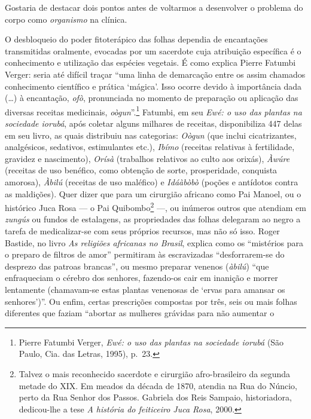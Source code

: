 Gostaria de destacar dois pontos antes de voltarmos a desenvolver o
problema do corpo como \textit{organismo} na clínica.

O desbloqueio do poder fitoterápico das folhas dependia de encantações
transmitidas oralmente, evocadas por um sacerdote cuja atribuição
específica é o conhecimento e utilização das espécies vegetais. É como
explica Pierre Fatumbi Verger: seria até difícil traçar ``uma linha de
demarcação entre os assim chamados conhecimento científico e prática
`mágica'. Isso ocorre devido à importância dada (\ldots{}) à encantação,
\textit{ofò}, pronunciada no momento de preparação ou aplicação das
diversas receitas medicinais, \textit{oògun}''.\footnote{Pierre Fatumbi
  Verger, \textit{Ewé: o uso das plantas na sociedade iorubá} (São Paulo,
  Cia. das Letras, 1995), p.~23.} Fatumbi, em seu \textit{Ewé: o uso das
plantas na sociedade iorubá}, após coletar alguns milhares de receitas,
disponibiliza 447 delas em seu livro, as quais distribuiu nas
categorias: \textit{Oògun} (que inclui cicatrizantes, analgésicos,
sedativos, estimulantes etc.), \textit{Ibímo} (receitas relativas à
fertilidade, gravidez e nascimento), \textit{Orísà} (trabalhos relativos
ao culto aos orixás), \textit{Àwúre} (receitas de uso benéfico, como
obtenção de sorte, prosperidade, conquista amorosa), \textit{Àbilú}
(receitas de uso maléfico) e \textit{Idáàbòbò} (poções e antídotos contra
as maldições). Quer dizer que para um cirurgião africano como Pai
Manoel, ou o histórico Juca Rosa --- o Pai Quibombo\footnote{Talvez o
  mais reconhecido sacerdote e cirurgião afro-brasileiro da segunda
  metade do XIX. Em meados da década de 1870, atendia na Rua do Núncio,
  perto da Rua Senhor dos Passos. Gabriela dos Reis Sampaio,
  historiadora, dedicou-lhe a tese \textit{A história do feiticeiro Juca
  Rosa}, 2000.} ---, ou inúmeros outros que atendiam em \textit{zungús} ou
fundos de estalagens, as propriedades das folhas delegaram ao negro a
tarefa de medicalizar-se com seus próprios recursos, mas não só isso.
Roger Bastide, no livro \textit{As religiões africanas no Brasil}, explica
como os ``mistérios para o preparo de filtros de amor'' permitiram às
escravizadas ``desforrarem-se do desprezo das patroas brancas'', ou
mesmo preparar venenos (\textit{àbilú}) ``que enfraqueciam o cérebro dos
senhores, fazendo-os cair em inanição e morrer lentamente (chamavam-se
estas plantas venenosas de `ervas para amansar os senhores')''. Ou
enfim, certas prescrições compostas por três, seis ou mais folhas
diferentes que faziam ``abortar as mulheres grávidas para não aumentar o
